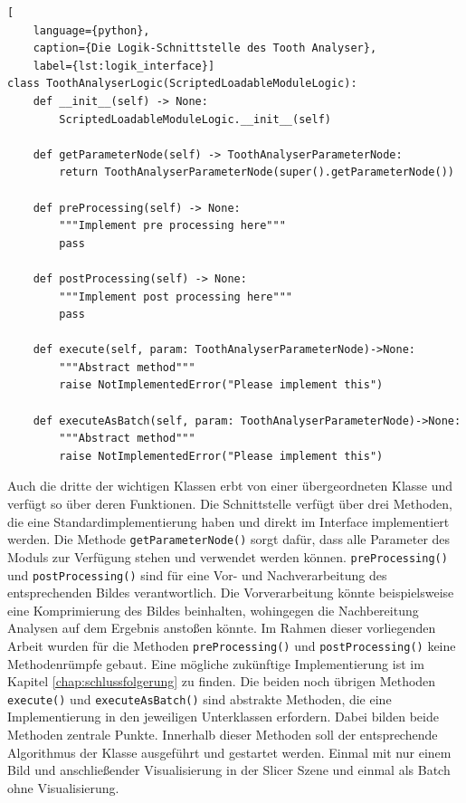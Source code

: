 \begin{lstlisting}[
    language={python},
    caption={Die Logik-Schnittstelle des Tooth Analyser},
    label={lst:logik_interface}]
class ToothAnalyserLogic(ScriptedLoadableModuleLogic):
    def __init__(self) -> None:
        ScriptedLoadableModuleLogic.__init__(self)

    def getParameterNode(self) -> ToothAnalyserParameterNode:
        return ToothAnalyserParameterNode(super().getParameterNode())

    def preProcessing(self) -> None:
        """Implement pre processing here"""
        pass

    def postProcessing(self) -> None:
        """Implement post processing here"""
        pass

    def execute(self, param: ToothAnalyserParameterNode)->None:
        """Abstract method"""
        raise NotImplementedError("Please implement this")

    def executeAsBatch(self, param: ToothAnalyserParameterNode)->None:
        """Abstract method"""
        raise NotImplementedError("Please implement this")
\end{lstlisting}

Auch die dritte der wichtigen Klassen erbt von einer übergeordneten Klasse und verfügt
so über deren Funktionen. Die Schnittstelle verfügt über drei Methoden, die eine
Standardimplementierung haben und direkt im Interface implementiert werden. Die
Methode \texttt{getParameterNode()} sorgt dafür, dass alle Parameter des Moduls
zur Verfügung stehen und verwendet werden können. \texttt{preProcessing()} und
\texttt{postProcessing()} sind für eine Vor- und Nachverarbeitung des
entsprechenden Bildes verantwortlich. Die Vorverarbeitung könnte beispielsweise eine
Komprimierung des Bildes beinhalten, wohingegen die Nachbereitung Analysen auf
dem Ergebnis anstoßen könnte. Im Rahmen dieser vorliegenden Arbeit wurden für die
Methoden \texttt{preProcessing()} und \texttt{postProcessing()} keine Methodenrümpfe
gebaut. Eine mögliche zukünftige Implementierung ist im Kapitel
\ref{chap:schlussfolgerung} zu finden. Die beiden noch übrigen Methoden \texttt{execute()}
und \texttt{executeAsBatch()} sind abstrakte Methoden, die eine Implementierung
in den jeweiligen Unterklassen erfordern. Dabei bilden beide Methoden zentrale Punkte.
Innerhalb dieser Methoden soll der entsprechende Algorithmus der Klasse
ausgeführt und gestartet werden. Einmal mit nur einem Bild und anschließender Visualisierung
in der Slicer Szene und einmal als Batch ohne Visualisierung.

